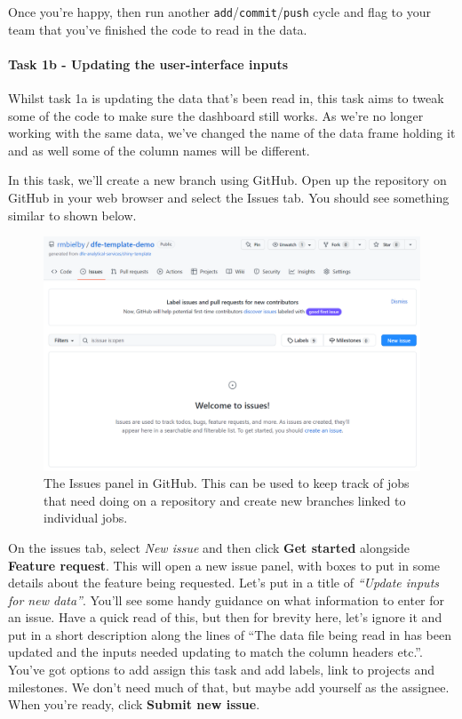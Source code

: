 \documentclass[
  12pt,
]{article}
\begin{document}
Once you're happy, then run another
\texttt{add}/\texttt{commit}/\texttt{push} cycle and flag to your team
that you've finished the code to read in the data.

\hypertarget{task-1b---updating-the-user-interface-inputs}{%
\paragraph{Task 1b - Updating the user-interface
inputs}\label{task-1b---updating-the-user-interface-inputs}}

Whilst task 1a is updating the data that's been read in, this task aims
to tweak some of the code to make sure the dashboard still works. As
we're no longer working with the same data, we've changed the name of
the data frame holding it and as well some of the column names will be
different.

In this task, we'll create a new branch using GitHub. Open up the
repository on GitHub in your web browser and select the Issues tab. You
should see something similar to shown below.

\begin{figure}

{\centering \includegraphics[width=0.92\linewidth]{images/gitdemo/gitdemo-GitHub-Issues} 

}

\caption{The Issues panel in GitHub. This can be used to keep track of jobs that need doing on a repository and create new branches linked to individual jobs.}\label{fig:unnamed-chunk-10}
\end{figure}

On the issues tab, select \emph{New issue} and then click \textbf{Get
started} alongside \textbf{Feature request}. This will open a new issue
panel, with boxes to put in some details about the feature being
requested. Let's put in a title of \emph{``Update inputs for new
data''}. You'll see some handy guidance on what information to enter for
an issue. Have a quick read of this, but then for brevity here, let's
ignore it and put in a short description along the lines of ``The data
file being read in has been updated and the inputs needed updating to
match the column headers etc.''. You've got options to add assign this
task and add labels, link to projects and milestones. We don't need much
of that, but maybe add yourself as the assignee. When you're ready,
click \textbf{Submit new issue}.
\end{document}
